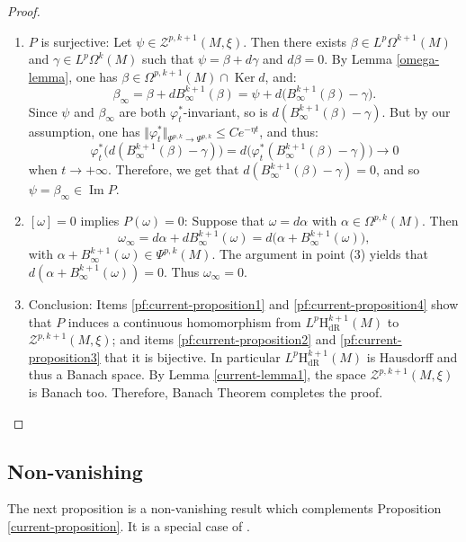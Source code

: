 \documentclass[JEP,XML,SOM,Unicode,published]{cedram}
\newcommand{\dR}{\mathrm{dR}}
\newcommand{\rH}{\mathrm{H}}
\theoremstyle{plain}
\theoremstyle{remark}
\theoremstyle{definition}
\DeclareMathOperator{\im}{Im}
\DeclareMathOperator{\Ker}{Ker}
\begin{document}
\begin{proof}
\begin{enumerate}
\item\label{pf:current-proposition3}
$P$ is surjective: Let $\psi \in \mathcal Z^{p,k+1} (M, \xi)$. Then there exists $\beta \in L^p \Omega^{k+1}(M)$
and $\gamma \in L^p \Omega^k (M)$ such that $\psi = \beta + d\gamma$ and $d\beta = 0$. By Lemma \ref{omega-lemma}, one has $\beta \in \Omega^{p,k+1}(M) \cap \Ker d$, and:
\[\beta_\infty = \beta + d B_\infty^{k+1} (\beta) = \psi + d \bigl(B_\infty^{k+1} (\beta) -\gamma\bigr).\]
Since $\psi$ and $\beta_\infty$ are both $\varphi_t^*$-invariant, so is $d (B_\infty^{k+1} (\beta) -\gamma)$.
But by our assumption, one has $\Vert \varphi_t^* \Vert_{\Psi^{p,k} \to \Psi^{p,k}} \leqslant C e^{-\eta t}$, and thus:
\[\varphi_t^* \bigl(d (B_\infty^{k+1} (\beta) -\gamma)\bigr) = d\bigl(\varphi_t^* (B_\infty^{k+1} (\beta) -\gamma)\bigr) \to 0\]
when $t \to +\infty$.
Therefore, we get that $d (B_\infty^{k+1} (\beta) -\gamma) =0$, and so $\psi = \beta_\infty \in \im P$.

\item\label{pf:current-proposition4}
$[\omega] =0$ implies $P(\omega) =0$:
Suppose that $\omega = d \alpha$ with $\alpha \in \Omega^{p,k}(M)$. Then
\[\omega_\infty = d\alpha + d B_\infty^{k+1} (\omega) = d\bigl(\alpha + B_\infty^{k+1} (\omega)\bigr),\]
with $\alpha \!+\! B_\infty^{k+1}(\omega) \!\in\! \Psi^{p,k} (M)$. The argument in point (3) yields that
\hbox{$d(\alpha + B_\infty^{k+1} (\omega))\!=\! 0$}. Thus $\omega_\infty =0$.

\item\label{pf:current-proposition5}
Conclusion: Items \eqref{pf:current-proposition1} and \eqref{pf:current-proposition4} show that $P$ induces a continuous homomorphism from $L^p \rH_\dR^{k+1} (M)$ to $\mathcal Z^{p,k+1} (M, \xi)$; and items \eqref{pf:current-proposition2} and \eqref{pf:current-proposition3} that it is bijective. In particular $L^p \rH_\dR^{k+1} (M)$ is
Hausdorff and thus a Banach space. By Lemma \ref{current-lemma1}, the space $\mathcal Z^{p,k+1} (M, \xi)$ is Banach too. Therefore, Banach Theorem completes the proof.\qedhere
\end{enumerate}
\end{proof}

\subsection{Non-vanishing}
The next proposition is a non-vanishing result which complements Proposition \ref{current-proposition}.
It is a special case of \cite[Cor.\,32]{Pa09}.
\end{document}
